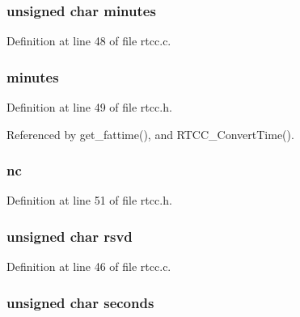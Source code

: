\hypertarget{unionrtcc_time_acf4ceb0d1cb80a37559ed7fd414cd389}{
\subsubsection[{minutes}]{\setlength{\rightskip}{0pt plus 5cm}unsigned char minutes}}\label{unionrtcc_time_acf4ceb0d1cb80a37559ed7fd414cd389}


Definition at line 48 of file rtcc.\-c.

\hypertarget{unionrtcc_time_a517646d9969ae9c9f8921e133b1b872b}{
\subsubsection[{minutes}]{ minutes}}\label{unionrtcc_time_a517646d9969ae9c9f8921e133b1b872b}


Definition at line 49 of file rtcc.\-h.



Referenced by get\-\_\-fattime(), and R\-T\-C\-C\-\_\-\-Convert\-Time().

\hypertarget{unionrtcc_time_a03419770df9441078fe8b24fce635d41}{
\subsubsection[{nc}]{ nc}}\label{unionrtcc_time_a03419770df9441078fe8b24fce635d41}


Definition at line 51 of file rtcc.\-h.

\hypertarget{unionrtcc_time_a49330ff1e61822649a18c185fddcf0b1}{
\subsubsection[{rsvd}]{\setlength{\rightskip}{0pt plus 5cm}unsigned char rsvd}}\label{unionrtcc_time_a49330ff1e61822649a18c185fddcf0b1}


Definition at line 46 of file rtcc.\-c.

\hypertarget{unionrtcc_time_a173027d8c297c3e800a19ec32217953e}{
\subsubsection[{seconds}]{\setlength{\rightskip}{0pt plus 5cm}unsigned char seconds}}\label{unionrtcc_time_a173027d8c297c3e800a19ec32217953e}


